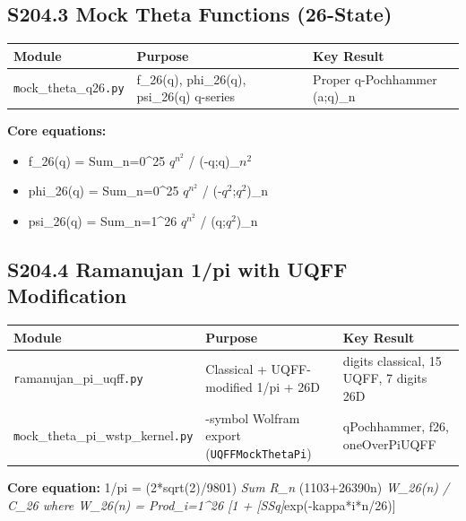 \documentclass[12pt,a4paper]{article}
\begin{document}
\subsection{S204.3 Mock Theta Functions (26-State)}

\begin{table}[H]
\centering
\small
\begin{tabularx}{\linewidth}{@{}>{\raggedright\arraybackslash}X>{\raggedright\arraybackslash}X>{\raggedright\arraybackslash}X@{}}
\toprule
Module & Purpose & Key Result \tabularnewline
\midrule
\texttt{m}ock\_{theta\_q26}\texttt{.py} & f\_26(q), phi\_26(q), psi\_26(q) q-series & Proper q-Pochhammer (a;q)\_n \tabularnewline
\bottomrule
\end{tabularx}
\end{table}

\textbf{Core equations:}

\begin{itemize}
  \item f\_26(q) = Sum\_{n=0}\^{}{25} $q^{n^2}$ / (-q;q)\_$n^{2}$
  \item phi\_26(q) = Sum\_{n=0}\^{}{25} $q^{n^2}$ / (-$q^{2}$;$q^{2}$)\_n
  \item psi\_26(q) = Sum\_{n=1}\^{}{26} $q^{n^2}$ / (q;$q^{2}$)\_n
\end{itemize}

\subsection{S204.4 Ramanujan 1/pi with UQFF Modification}

\begin{table}[H]
\centering
\small
\begin{tabularx}{\linewidth}{@{}>{\raggedright\arraybackslash}X>{\raggedright\arraybackslash}X>{\raggedright\arraybackslash}X@{}}
\toprule
Module & Purpose & Key Result \tabularnewline
\midrule
\texttt{r}amanujan\_{pi\_uqff}\texttt{.py} & Classical + UQFF-modified 1/pi + 26D & 21 digits classical, 15 UQFF, 7 digits 26D \tabularnewline
\texttt{m}ock\_{theta\_pi\_wstp\_kernel}\texttt{.py} & 9-symbol Wolfram export (\texttt{UQFFMockThetaPi}) & qPochhammer, f26, oneOverPiUQFF \tabularnewline
\bottomrule
\end{tabularx}
\end{table}

\textbf{Core equation:} 1/pi = (2*sqrt(2)/9801) \emph{ Sum R\_n } (1103+26390n) \emph{ W\_26(n) / C\_26 where W\_26(n) = Prod\_{i=1}\^{}{26} [1 + [SSq]}exp(-kappa*i*n/26)]
\end{document}
